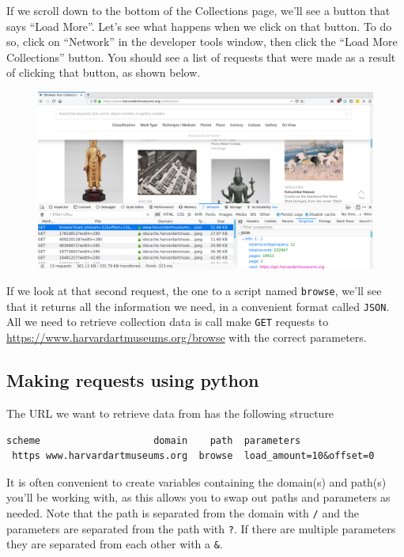 \documentclass[]{book}
\begin{document}
If we scroll down to the bottom of the Collections page, we'll see a
button that says ``Load More''. Let's see what happens when we click on
that button. To do so, click on ``Network'' in the developer tools
window, then click the ``Load More Collections'' button. You should see
a list of requests that were made as a result of clicking that button,
as shown below.

\begin{figure}
\centering
\includegraphics{Python/PythonWebScrape/images/dev_tools_network.png}
\caption{}
\end{figure}

If we look at that second request, the one to a script named
\texttt{browse}, we'll see that it returns all the information we need,
in a convenient format called \texttt{JSON}. All we need to retrieve
collection data is call make \texttt{GET} requests to
\url{https://www.harvardartmuseums.org/browse} with the correct
parameters.

\subsection{Making requests using
python}\label{making-requests-using-python}

The URL we want to retrieve data from has the following structure

\begin{verbatim}
scheme                    domain    path  parameters
 https www.harvardartmuseums.org  browse  load_amount=10&offset=0
\end{verbatim}

It is often convenient to create variables containing the domain(s) and
path(s) you'll be working with, as this allows you to swap out paths and
parameters as needed. Note that the path is separated from the domain
with \texttt{/} and the parameters are separated from the path with
\texttt{?}. If there are multiple parameters they are separated from
each other with a \texttt{\&}.
\end{document}
